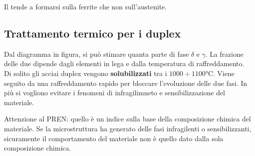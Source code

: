 
Il  tende a formarsi sulla ferrite che non sull'austenite.

\subsection{Trattamento termico per i duplex}
Dal diagramma in figura, si può stimare quanta parte di fase $\delta$ e $\gamma$. La frazione delle due dipende dagli elementi in lega e dalla temperatura di raffreddamento.
Di solito gli acciai duplex vengono \textbf{solubilizzati} tra i $1000\div 1100\unit{\celsius}$. Viene seguito da una raffreddamento rapido per bloccare l'evoluzione delle due fasi. In più si vogliono evitare i fenomeni di infragilimneto e sensibilizzazione del materiale.


Attenzione al \ac{PREN}: quello è un indice sulla base della composizione chimica del materiale. Se la microstruttura ha generato delle fasi infragilenti o sensibilizzanti, sicuramente il comportamento del materiale non è quello dato dalla sola composizione chimica. 